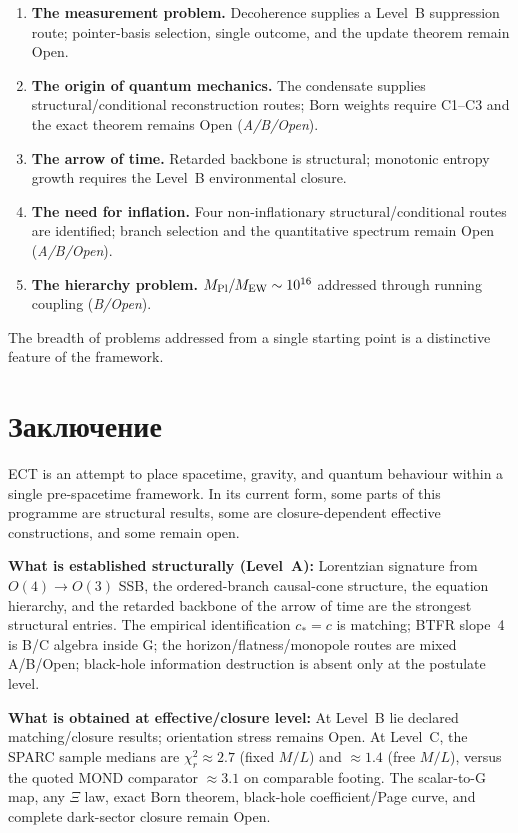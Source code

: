 \documentclass[11pt,a4paper]{article}
\begin{document}
\begin{enumerate}
\item \textbf{The measurement problem.} Decoherence supplies a Level~B suppression route; pointer-basis selection, single outcome, and the update theorem remain Open.

\item \textbf{The origin of quantum mechanics.} The condensate supplies structural/conditional reconstruction routes; Born weights require C1--C3 and the exact theorem remains Open (\emph{A/B/Open}).

\item \textbf{The arrow of time.} Retarded backbone is structural; monotonic entropy growth requires the Level~B environmental closure.

\item \textbf{The need for inflation.} Four non-inflationary structural/conditional routes are identified; branch selection and the quantitative spectrum remain Open (\emph{A/B/Open}).

\item \textbf{The hierarchy problem.} $M_{\rm Pl}/M_{\rm EW} \sim 10^{16}$ addressed through running coupling (\emph{B/Open}).
\end{enumerate}

The breadth of problems addressed from a single starting point is a distinctive feature of the framework.


\section{Заключение}

ECT is an attempt to place spacetime, gravity, and quantum behaviour within a single pre-spacetime framework. In its current form, some parts of this programme are structural results, some are closure-dependent effective constructions, and some remain open.

\textbf{What is established structurally (Level~A):}
Lorentzian signature from $O(4) \to O(3)$ SSB, the ordered-branch causal-cone structure, the equation hierarchy, and the retarded backbone of the arrow of time are the strongest structural entries. The empirical identification $c_*=c$ is matching; BTFR slope~4 is B/C algebra inside G; the horizon/flatness/monopole routes are mixed A/B/Open; black-hole information destruction is absent only at the postulate level.

\textbf{What is obtained at effective/closure level:}
At Level~B lie declared matching/closure results; orientation stress remains Open.  At Level~C, the SPARC sample medians are $\chi_r^2\approx2.7$ (fixed $M/L$) and $\approx1.4$ (free $M/L$), versus the quoted MOND comparator $\approx3.1$ on comparable footing.  The scalar-to-G map, any $\Xi$ law, exact Born theorem, black-hole coefficient/Page curve, and complete dark-sector closure remain Open.
\end{document}

